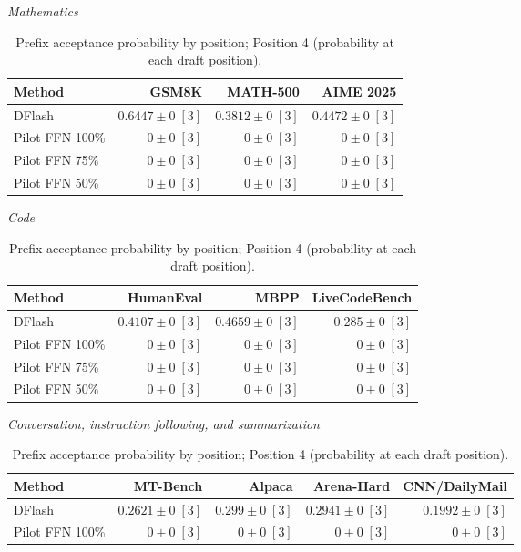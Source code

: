 \begin{table}[!htp]
\centering\small
\setlength{\tabcolsep}{3pt}
\caption{Prefix acceptance probability by position; Position 4 (probability at each draft position).}
\label{tab:appendix-metric-prefix-survival-4}
\textit{Mathematics}\par\smallskip
\begin{tabular}{@{}>{\raggedright\arraybackslash}p{3.7cm}rrr@{}}
\toprule
Method & GSM8K & MATH-500 & AIME 2025 \\
\midrule
DFlash & \(\mathbf{0.6447} \pm 0\;[3]\) & \(\mathbf{0.3812} \pm 0\;[3]\) & \(\mathbf{0.4472} \pm 0\;[3]\) \\
Pilot FFN 100\% & \(0 \pm 0\;[3]\) & \(0 \pm 0\;[3]\) & \(0 \pm 0\;[3]\) \\
Pilot FFN 75\% & \(0 \pm 0\;[3]\) & \(0 \pm 0\;[3]\) & \(0 \pm 0\;[3]\) \\
Pilot FFN 50\% & \(0 \pm 0\;[3]\) & \(0 \pm 0\;[3]\) & \(0 \pm 0\;[3]\) \\
\bottomrule
\end{tabular}\par\medskip
\textit{Code}\par\smallskip
\begin{tabular}{@{}>{\raggedright\arraybackslash}p{3.7cm}rrr@{}}
\toprule
Method & HumanEval & MBPP & LiveCodeBench \\
\midrule
DFlash & \(\mathbf{0.4107} \pm 0\;[3]\) & \(\mathbf{0.4659} \pm 0\;[3]\) & \(\mathbf{0.285} \pm 0\;[3]\) \\
Pilot FFN 100\% & \(0 \pm 0\;[3]\) & \(0 \pm 0\;[3]\) & \(0 \pm 0\;[3]\) \\
Pilot FFN 75\% & \(0 \pm 0\;[3]\) & \(0 \pm 0\;[3]\) & \(0 \pm 0\;[3]\) \\
Pilot FFN 50\% & \(0 \pm 0\;[3]\) & \(0 \pm 0\;[3]\) & \(0 \pm 0\;[3]\) \\
\bottomrule
\end{tabular}\par\medskip
\textit{Conversation, instruction following, and summarization}\par\smallskip
\begin{tabular}{@{}>{\raggedright\arraybackslash}p{3.7cm}rrrr@{}}
\toprule
Method & MT-Bench & Alpaca & Arena-Hard & CNN/DailyMail \\
\midrule
DFlash & \(\mathbf{0.2621} \pm 0\;[3]\) & \(\mathbf{0.299} \pm 0\;[3]\) & \(\mathbf{0.2941} \pm 0\;[3]\) & \(\mathbf{0.1992} \pm 0\;[3]\) \\
Pilot FFN 100\% & \(0 \pm 0\;[3]\) & \(0 \pm 0\;[3]\) & \(0 \pm 0\;[3]\) & \(0 \pm 0\;[3]\) \\

\end{tabular}
\end{table}
